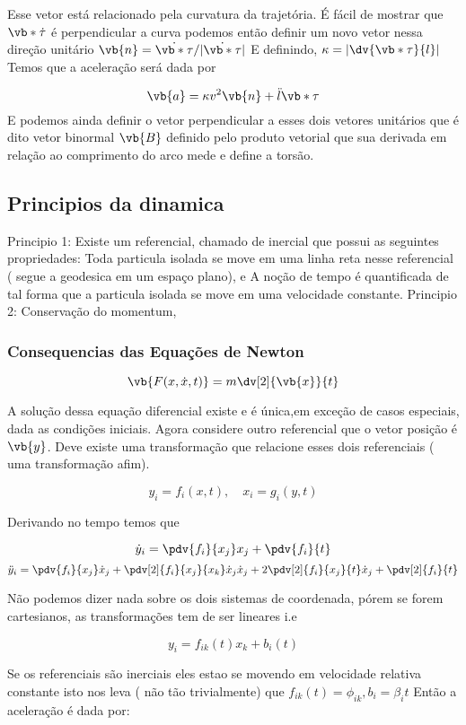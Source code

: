 \documentclass{article}
\begin{document}
 Esse vetor está relacionado pela curvatura da trajetória. É fácil de mostrar que $\vb*{\dot{\tau}}$ é perpendicular a curva podemos então definir um novo vetor nessa direção unitário $\vb{n}=\dot{\vb*{\tau}}/|\dot{\vb*{\tau}}|$ E definindo, $\kappa= |\dv{\vb*{\tau}}{l}|$ Temos que a aceleração será dada por
 
 $$\vb{a}=\kappa v^2 \vb{n}+ \ddot{l}\vb*{\tau}$$ E podemos ainda definir o vetor perpendicular a esses dois vetores unitários que é dito vetor binormal $\vb{B}$ definido pelo produto vetorial que sua derivada em relação ao comprimento do arco mede e define a torsão.
\subsection{Principios da dinamica}

Principio 1: Existe um referencial, chamado de inercial que possui as seguintes propriedades: Toda particula isolada se move em uma linha reta nesse referencial ( segue a geodesica em um espaço plano), e A noção de tempo é quantificada de tal forma que a particula isolada se move em uma velocidade constante. Principio 2: Conservação do momentum,



\subsubsection{Consequencias das Equações de Newton}

$$\vb{F(x,\dot{x},t)}=m\dv[2]{\vb{x}}{t}$$

A solução dessa equação diferencial existe e é única,em exceção de casos especiais, dada as condições iniciais. Agora considere outro referencial que o vetor posição é $\vb{y}$. Deve existe uma transformação que relacione esses dois referenciais ( uma transformação afim).

$$y_i=f_i(x,t), \quad x_i=g_i(y,t)$$

Derivando no tempo temos que


$$\dot{y}_i= \pdv{f_i}{x_j}x_j+\pdv{f_i}{t}$$
$$ \ddot{y}_i=\pdv{f_i}{x_j}\dot{x}_j+\pdv[2]{f_i}{x_j}{x_k}\dot{x}_j\dot{x}_j+2\pdv[2]{f_i}{x_j}{t}\dot{x}_j+\pdv[2]{f_i}{t}$$

Não podemos dizer nada sobre os dois sistemas de coordenada, pórem se forem cartesianos, as transformações tem de ser lineares i.e

$$y_i=f_{ik} (t)x_k+b_i(t)$$

Se os referenciais são inerciais eles estao se movendo em velocidade relativa constante isto nos leva ( não tão trivialmente) que $f_{ik}(t)=\phi_{ik},b_i= \beta_i t$ Então a aceleração é dada por:
\end{document}
